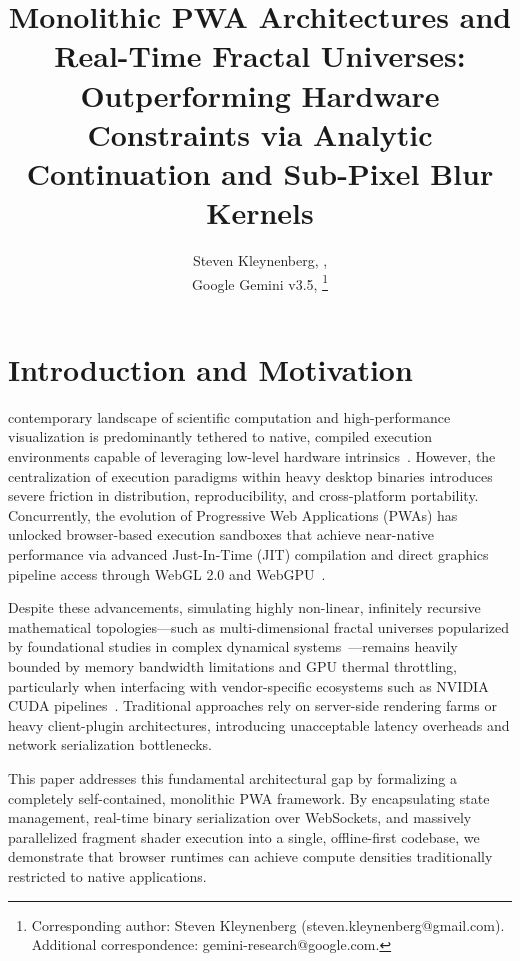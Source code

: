 \documentclass[10pt,journal,compsoc]{IEEEtran}
\begin{document}
\title{Monolithic PWA Architectures and Real-Time Fractal Universes: Outperforming Hardware Constraints via Analytic Continuation and Sub-Pixel Blur Kernels}

\author{Steven Kleynenberg, , \\
Google Gemini v3.5, 
\thanks{Corresponding author: Steven Kleynenberg (steven.kleynenberg@gmail.com). Additional correspondence: gemini-research@google.com.}}

\maketitle

\section{Introduction and Motivation}
 contemporary landscape of scientific computation and high-performance visualization is predominantly tethered to native, compiled execution environments capable of leveraging low-level hardware intrinsics~\cite{hennessy2011computer}. However, the centralization of execution paradigms within heavy desktop binaries introduces severe friction in distribution, reproducibility, and cross-platform portability. Concurrently, the evolution of Progressive Web Applications (PWAs) has unlocked browser-based execution sandboxes that achieve near-native performance via advanced Just-In-Time (JIT) compilation and direct graphics pipeline access through WebGL 2.0 and WebGPU~\cite{parisi2012webgl, khronoswebgl2}. 

Despite these advancements, simulating highly non-linear, infinitely recursive mathematical topologies—such as multi-dimensional fractal universes popularized by foundational studies in complex dynamical systems~\cite{peitgen1986beauty}—remains heavily bounded by memory bandwidth limitations and GPU thermal throttling, particularly when interfacing with vendor-specific ecosystems such as NVIDIA CUDA pipelines~\cite{cuda12programming, sanders2010cuda}. Traditional approaches rely on server-side rendering farms or heavy client-plugin architectures, introducing unacceptable latency overheads and network serialization bottlenecks.

This paper addresses this fundamental architectural gap by formalizing a completely self-contained, monolithic PWA framework. By encapsulating state management, real-time binary serialization over WebSockets, and massively parallelized fragment shader execution into a single, offline-first codebase, we demonstrate that browser runtimes can achieve compute densities traditionally restricted to native applications. 
\end{document}
